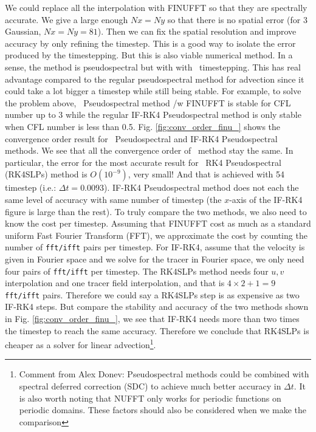 \documentclass[11pt,letterpaper]{article}
\begin{document}
We could replace all the interpolation with FINUFFT so that they are spectrally accurate. We give a large enough $Nx = Ny$ so that there is no spatial error (for 3 Gaussian, $Nx = Ny = 81$). Then we can fix the spatial resolution and improve accuracy by only refining the timestep. This is a good way to isolate the error produced by the timestepping. But this is also viable numerical method. In a sense, the method is pseudospectral but with with \sml\ timestepping. This has real advantage compared to the regular pseudospectral method for advection since it could take a lot bigger a timestep while still being stable. 
For example, to solve the problem above, \sml\ Pseudospectral method /w FINUFFT is stable for CFL number up to 3 while the regular IF-RK4 Pseudospectral method is only stable when CFL number is less than 0.5. Fig. \ref{fig:conv_order_finu_} shows the convergence order result for \sml\ Pseudospectral and IF-RK4 Pseudospectral methods. We see that all the convergence order of \sml\ method stay the same. In particular, the error for the most accurate result for \sml\ RK4 Pseudospectral (RK4SLPs) method is $O(10^{-9})$, very small! And that is achieved with 54 timestep (i.e.: $\Delta t = 0.0093$). IF-RK4 Pseudospectral method does not each the same level of accuracy with same number of timestep (the $x$-axis of the IF-RK4 figure is large than the rest). To truly compare the two methods, we also need to know the cost per timestep. Assuming that FINUFFT cost as much as a standard uniform Fast Fourier Transform (FFT), we approximate the cost by counting the number of \texttt{fft/ifft} pairs per timestep. For IF-RK4, assume that the velocity is given in Fourier space and we solve for the tracer in Fourier space, we only need four pairs of \texttt{fft/ifft} per timestep. The RK4SLPs method needs four $u,v$ interpolation and one tracer field interpolation, and that is $4\times 2+1 = 9$ \texttt{fft/ifft} pairs. Therefore we could say a RK4SLPs step is as expensive as two IF-RK4 steps. But compare the stability and accuracy of the two methods shown in Fig. \ref{fig:conv_order_finu_}, we see that IF-RK4 needs more than two times the timestep to reach the same accuracy. Therefore we conclude that RK4SLPs is cheaper as a solver for linear advection\footnote{Comment from Alex Donev: Pseudospectral methods could be combined with spectral deferred correction (SDC) to achieve much better accuracy in $\Delta t$. It is also worth noting that NUFFT only works for periodic functions on periodic domains. These factors should also be considered when we make the comparison}.
\end{document}
